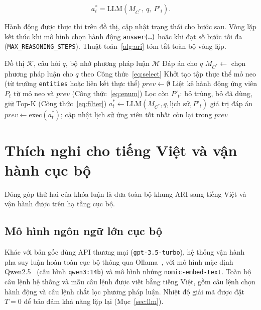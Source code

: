 \begin{equation}
\label{eq:decide}
a^*_i = \mathrm{LLM}(M_{C^*},\ q,\ P'_i).
\end{equation}

Hành động được thực thi trên đồ thị, cập nhật trạng thái cho bước sau. Vòng lặp kết thúc khi mô hình
chọn hành động \texttt{answer(\dots)} hoặc khi đạt số bước tối đa
(\texttt{MAX\_REASONING\_STEPS}). Thuật toán~\ref{alg:ari} tóm tắt toàn bộ vòng lặp.

\begin{algorithm}[ht]
\caption{Suy luận trừu tượng quy nạp (vòng lặp suy luận)}
\label{alg:ari}
\begin{algorithmic}[1]
\Require Đồ thị $\mathcal{K}$, câu hỏi $q$, bộ nhớ phương pháp luận $\mathcal{M}$
\Ensure Đáp án cho $q$
\State $M_{C^*} \gets$ chọn phương pháp luận cho $q$ theo Công thức~\eqref{eq:select}
\State Khởi tạo tập thực thể mỏ neo (từ trường \texttt{entities} hoặc liên kết thực thể)
\State $prev \gets \emptyset$
  \State Liệt kê hành động ứng viên $P_t$ từ mỏ neo và $prev$ (Công thức~\eqref{eq:enum})
  \State Lọc còn $P'_t$: bỏ trùng, bỏ đã dùng, giữ Top-K (Công thức~\eqref{eq:filter})
  \State $a^*_t \gets \mathrm{LLM}(M_{C^*}, q, \text{lịch sử}, P'_t)$ 
    \State \Return giá trị đáp án
  \EndIf
  \State $prev \gets \mathrm{exec}(a^*_t)$; cập nhật lịch sử
\EndFor
\State \Return ứng viên tốt nhất còn lại trong $prev$
\end{algorithmic}
\end{algorithm}

\section{Thích nghi cho tiếng Việt và vận hành cục bộ}
\label{sec:vietnamese-adapt}

Đóng góp thứ hai của khóa luận là đưa toàn bộ khung ARI sang tiếng Việt và vận hành được trên hạ
tầng cục bộ.

\subsection{Mô hình ngôn ngữ lớn cục bộ}
\label{sec:local-llm}

Khác với bản gốc dùng API thương mại (\texttt{gpt-3.5-turbo}), hệ thống vận hành pha suy luận hoàn
toàn cục bộ thông qua Ollama~\cite{ollama}, với mô hình mặc định Qwen2.5~\cite{qwen2025} (cấu hình
\texttt{qwen3:14b}) và mô hình nhúng \texttt{nomic-embed-text}. Toàn bộ câu lệnh hệ thống và mẫu câu
lệnh được viết bằng tiếng Việt, gồm câu lệnh chọn hành động và câu lệnh chắt lọc phương pháp luận.
Nhiệt độ giải mã được đặt $T = 0$ để bảo đảm khả năng lặp lại (Mục~\ref{sec:llm}).

